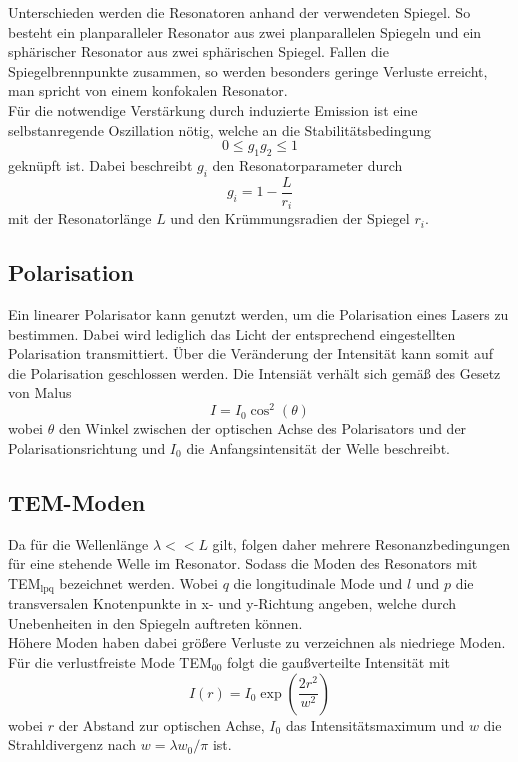 Unterschieden werden die Resonatoren anhand der verwendeten Spiegel. So besteht ein planparalleler Resonator aus zwei planparallelen Spiegeln und ein sphärischer Resonator aus zwei sphärischen Spiegel.
Fallen die Spiegelbrennpunkte zusammen, so werden besonders geringe Verluste erreicht, man spricht von einem konfokalen Resonator.\\
Für die notwendige Verstärkung durch induzierte Emission ist eine selbstanregende Oszillation nötig, welche an die Stabilitätsbedingung
\begin{equation}
    0 \leq g_1 g_2\leq 1
    \label{eq:stabil}
\end{equation}
geknüpft ist. Dabei beschreibt $g_i$ den Resonatorparameter durch
\begin{equation}
    g_i=1-\frac{L}{r_i}
\end{equation}
mit der Resonatorlänge $L$ und den Krümmungsradien der Spiegel $r_i$.\\
\subsection{Polarisation}
Ein linearer Polarisator kann genutzt werden, um die Polarisation eines Lasers zu bestimmen. Dabei wird lediglich das Licht der entsprechend eingestellten Polarisation transmittiert.
Über die Veränderung der Intensität kann somit auf die Polarisation geschlossen werden. Die Intensiät verhält sich gemäß des Gesetz von Malus
\begin{equation}
    I=I_0\cos^2(\theta)
\end{equation}
wobei $\theta$ den Winkel zwischen der optischen Achse des Polarisators und der Polarisationsrichtung und $I_0$ die Anfangsintensität der Welle beschreibt.

\subsection{TEM-Moden}
Da für die Wellenlänge $\lambda<<L$ gilt, folgen daher mehrere Resonanzbedingungen für eine stehende Welle im Resonator.
Sodass die Moden des Resonators mit TEM$_{\text{lpq}}$ bezeichnet werden. Wobei $q$ die longitudinale Mode und $l$ und $p$
die transversalen Knotenpunkte in x- und y-Richtung angeben, welche durch Unebenheiten in den Spiegeln auftreten können.\\
Höhere Moden haben dabei größere Verluste zu verzeichnen als niedriege Moden. Für die verlustfreiste Mode TEM$_{00}$ folgt die  gaußverteilte
Intensität mit
\begin{equation}
    I(r)=I_0\exp\left(\frac{2r^2}{w^2}\right)
\end{equation}
wobei $r$ der Abstand zur optischen Achse, $I_0$ das Intensitätsmaximum und $w$ die Strahldivergenz nach $w=\lambda w_0/\pi$ ist.
